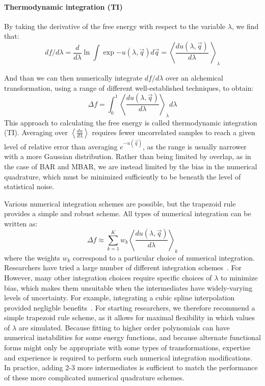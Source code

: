 \documentclass[9pt,bestpractices]{livecoms}
\newcommand{\expect}[1]{\left\langle{#1}\right\rangle}
\begin{document}
\paragraph{Thermodynamic integration (TI)}

By taking the derivative of the free energy with respect to the
variable $\lambda$, we find that:
\begin{equation}
df/d\lambda = \frac{d}{d\lambda} \ln \int \exp{-u(\lambda,\vec{q})} d\vec{q} = \expect{\frac{du(\lambda,\vec{q})}{d\lambda}\
}_{\lambda} 
\end{equation}

And than we can then numerically integrate $df/d\lambda$ over an alchemical transformation, using a range of different well-established techniques, to obtain:
\begin{equation}
\Delta f    = \int_{0}^{1} \expect{\frac{du(\lambda,\vec{q})}{d\lambda}}_{\lambda}  d\lambda    
\end{equation}
This approach to calculating the free energy is called thermodynamic integration (TI). Averaging over $\expect{\frac{du}{d\lambda}}$ requires
fewer uncorrelated samples to reach a given level of relative error
than averaging $e^{-u(\vec{q})}$, as the range is usually
narrower with a more Gaussian distribution. Rather than being limited by overlap, as in the case of BAR and MBAR, we are instead limited by the bias in the numerical quadrature, which must be minimized sufficiently to be beneath the level of statistical noise.

Various numerical integration schemes are possible, but the trapezoid
rule provides a simple and robust scheme.  All types of
numerical integration can be written as:
\[ \Delta f \approx \sum_{k=1}^{K} w_k
\expect{\frac{du(\lambda,\vec{q})}{d\lambda}}_{k} \] where the weights
$w_k$ correspond to a particular choice of numerical integration.
Researchers have tried a large number of different integration
schemes~\cite{resat.mezei.93,jorge_effect_2010,shyu_reducing_2009}. For However, many other integration choices require specific choices of $\lambda$
to minimize bias, which makes them unsuitable when the intermediates
have widely-varying levels of uncertainty. For example, integrating a cubic spline interpolation provided negligble benefits~\cite{paliwal.benchmark}. For starting researchers, we therefore recommend a simple trapezoid rule scheme, as it allows for maximal flexibility in which values of $\lambda$ are simulated.  Because fitting to higher
order polynomials can have numerical instabilities for some energy functions, and because alternate functional forms might only be appropriate
with some types of transformations, expertise and experience is
required to perform such numerical integration modifications.  In practice, adding 2-3 more intermediates is sufficient to match the performance of these more complicated numerical quadrature schemes.
\end{document}
